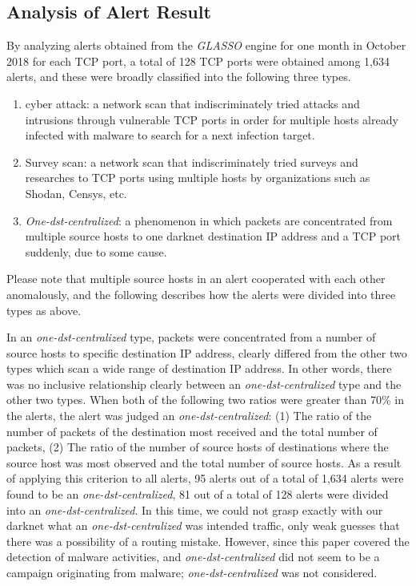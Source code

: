 \documentclass[conference]{IEEEtran}
\begin{document}
\subsection{Analysis of Alert Result}
By analyzing alerts obtained from the {\it GLASSO} engine for one month in October 2018 for each TCP port, a total of 128 TCP ports were obtained among 1,634 alerts, and these were broadly classified into the following three types.
\begin{enumerate}
  \item cyber attack: a network scan that indiscriminately tried attacks and intrusions through vulnerable TCP ports in order for multiple hosts already infected with malware to search for a next infection target.
  \item Survey scan: a network scan that indiscriminately tried surveys and researches to TCP ports using multiple hosts by organizations such as Shodan, Censys, etc.
  \item {\it One-dst-centralized}: a phenomenon in which packets are concentrated from multiple source hosts to one darknet destination IP address and a TCP port suddenly, due to some cause.
\end{enumerate}
Please note that multiple source hosts in an alert cooperated with each other anomalously, and the following describes how the alerts were divided into three types as above.


In an {\it one-dst-centralized} type, packets were concentrated from a number of source hosts to specific destination IP address, clearly differed from the other two types which scan a wide range of destination IP address.
In other words, there was no inclusive relationship clearly between an {\it one-dst-centralized} type and the other two types.
When both of the following two ratios were greater than 70\% in the alerts, the alert was judged an {\it one-dst-centralized}: (1) The ratio of the number of packets of the destination most received and the total number of packets, (2) The ratio of the number of source hosts of destinations where the source host was most observed and the total number of source hosts.
As a result of applying this criterion to all alerts, 95 alerts out of a total of 1,634 alerts were found to be an {\it one-dst-centralized}, 81 out of a total of 128 alerts were divided into an {\it one-dst-centralized}.
In this time, we could not grasp exactly with our darknet what an {\it one-dst-centralized} was intended traffic, only weak guesses that there was a possibility of a routing mistake.
However, since this paper covered the detection of malware activities, and {\it one-dst-centralized} did not seem to be a campaign originating from malware; {\it one-dst-centralized} was not considered.
\end{document}
